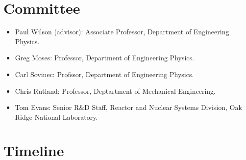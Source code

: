 \documentclass[letterpaper,12pt]{article}
\begin{document}
\section{Committee}

\begin{itemize}
\item Paul Wilson (advisor): Associate Professor, Department of
  Engineering Physics.
\item Greg Moses: Professor, Department of Engineering Physics.
\item Carl Sovinec: Profssor, Department of Engineering Physics.
\item Chris Rutland: Professor, Deptartment of Mechanical Engineering.
\item Tom Evans: Senior R\&D Staff, Reactor and Nuclear Systems
  Division, Oak Ridge National Laboratory.

\end{itemize}

\section{Timeline}

\pagebreak


\end{document}
